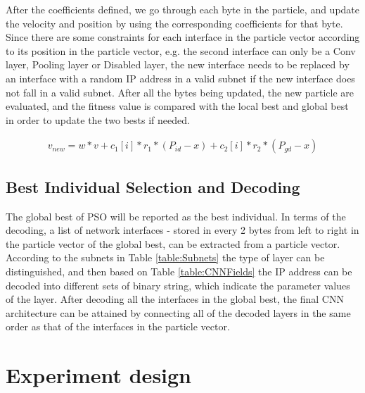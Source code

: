 \documentclass[conference]{IEEEtran}
\begin{document}
After the coefficients defined, we go through each byte in the particle, and update the velocity and position by using the corresponding coefficients for that byte. Since there are some constraints for each interface in the particle vector according to its position in the particle vector, e.g. the second interface can only be a Conv layer, Pooling layer or Disabled layer, the new interface needs to be replaced by an interface with a random IP address in a valid subnet if the new interface does not fall in a valid subnet. After all the bytes being updated, the new particle are evaluated, and the fitness value is compared with the local best and global best in order to update the two bests if needed.

\begin{equation}\label{eq:UpdateVNew}
\begin{aligned}
v_{new} = w * v + c_{1}[i] * r_{1} * (P_{id} - x) + c_{2}[i] * r_{2} * (P_{gd} - x)
\end{aligned}
\end{equation}


\subsection{Best Individual Selection and Decoding}

The global best of PSO will be reported as the best individual. In terms of the decoding, a list of network interfaces - stored in every 2 bytes from left to right in the particle vector of the global best, can be extracted from a particle vector. According to the subnets in Table \ref{table:Subnets} the type of layer can be distinguished, and then based on Table \ref{table:CNNFields} the IP address can be decoded into different sets of binary string, which indicate the parameter values of the layer. After decoding all the interfaces in the global best, the final CNN architecture can be attained by connecting all of the decoded layers in the same order as that of the interfaces in the particle vector.

\section{Experiment design}\label{sec:EPDesign}

\end{document}
